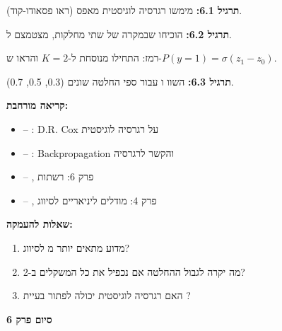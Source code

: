 \textbf{תרגיל \num{6.1}:} מימשו רגרסיה לוגיסטית מאפס (ראו פסאודו-קוד).

\textbf{תרגיל \num{6.2}:} הוכיחו שבמקרה של שתי מחלקות,  מצטמצם ל.

רמז: התחילו מנוסחת  ל-$K=2$ והראו ש-$P(y=1) = \sigma(z_1 - z_0)$.

\textbf{תרגיל \num{6.3}:} השוו  ו עבור ספי החלטה שונים (\num{0.3}, \num{0.5}, \num{0.7}).

\textbf{קריאה מורחבת:}

\begin{itemize}
\item \cite{cox1958} – : D.R. Cox על רגרסיה לוגיסטית
\item \cite{rumelhart1986} – : Backpropagation והקשר לרגרסיה
\item \cite{goodfellow2016} – , פרק \num{6}: רשתות 
\item \cite{bishop2006} – , פרק \num{4}: מודלים ליניאריים לסיווג
\end{itemize}

\textbf{שאלות להעמקה:}

\begin{enumerate}
\item מדוע  מתאים יותר מ לסיווג?
\item מה יקרה לגבול ההחלטה אם נכפיל את כל המשקלים ב-\num{2}?
\item האם רגרסיה לוגיסטית יכולה לפתור בעיית ?
\end{enumerate}

\textbf{סיום פרק \num{6}}

